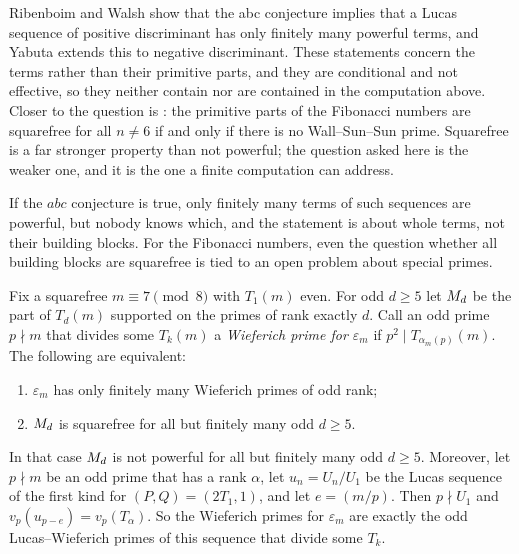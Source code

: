 \begin{remark}
Ribenboim and Walsh \cite[Corollary~2]{RibenboimWalsh1999} show that the abc conjecture implies that a Lucas sequence of positive discriminant has only
finitely many powerful terms, and Yabuta \cite{Yabuta2007} extends this to negative discriminant. These statements concern the terms rather
than their primitive parts, and they are conditional and not effective, so they neither contain nor are contained in the computation
above. Closer to the question is \cite[Corollary~5.1]{RossShenCai2026}: the primitive parts of the Fibonacci numbers are squarefree for all
$n \ne 6$ if and only if there is no Wall--Sun--Sun prime. Squarefree is a far stronger property than not powerful; the question asked here
is the weaker one, and it is the one a finite computation can address.
\end{remark}

\inwords If the $abc$ conjecture is true, only finitely many terms of such sequences are powerful, but nobody knows which, and the
statement is about whole terms, not their building blocks. For the Fibonacci numbers, even the question whether all building blocks are
squarefree is tied to an open problem about special primes.

\begin{proposition}
Fix a squarefree $m \equiv 7 \pmod 8$ with $T_1(m)$ even. For odd $d \ge 5$ let $M_{d}$ be the part of $T_d(m)$ supported on the
primes of rank exactly $d$. Call an odd prime $p \nmid m$ that divides some $T_k(m)$ a \emph{Wieferich prime for $\varepsilon_m$} if
$p^2 \mid T_{\alpha_m(p)}(m)$. The following are equivalent:
\begin{enumerate}
\item[(i)] $\varepsilon_m$ has only finitely many Wieferich primes of odd rank;
\item[(ii)] $M_{d}$ is squarefree for all but finitely many odd $d \ge 5$.
\end{enumerate}
In that case $M_{d}$ is not powerful for all but finitely many odd $d \ge 5$. Moreover, let $p \nmid m$ be an odd prime that has a rank $\alpha$, let
$u_n = U_n/U_1$ be the Lucas sequence of the first kind for $(P, Q) = (2T_1, 1)$, and let $e = (m/p)$. Then $p \nmid U_1$ and $v_p(u_{p - e}) = v_p(T_\alpha)$.
So the Wieferich primes for $\varepsilon_m$ are exactly the odd Lucas--Wieferich primes of this sequence that divide some $T_k$.
\end{proposition}

